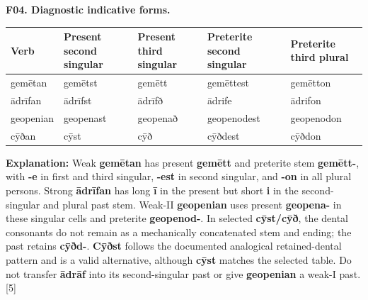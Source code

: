 \par\begin{minipage}{\linewidth}\raggedright
\textbf{F04. Diagnostic indicative forms.}

\par\begingroup
\fontsize{10.5}{13.2}\selectfont
\setlength{\LTleft}{0pt}\setlength{\LTright}{\fill}
\noindent
\begin{tabular}{@{}>{\raggedright\arraybackslash}p{18mm}>{\raggedright\arraybackslash}p{23mm}>{\raggedright\arraybackslash}p{22mm}>{\raggedright\arraybackslash}p{26mm}>{\raggedright\arraybackslash}p{23.76mm}@{}}
\toprule
\textbf{Verb} & \textbf{Present second singular} & \textbf{Present third singular} & \textbf{Preterite second singular} & \textbf{Preterite third plural} \\
\midrule
gemētan & gemētst & gemētt & gemēttest & gemētton \\
ādrīfan & ādrīfst & ādrīfð & ādrife & ādrifon \\
geopenian & geopenast & geopenað & geopenodest & geopenodon \\
cȳðan & cȳst & cȳð & cȳðdest & cȳðdon \\
\bottomrule
\end{tabular}
\par\endgroup

\textbf{Explanation:} Weak \textbf{gemētan} has present \textbf{gemētt} and preterite stem \textbf{gemētt-}, with \textbf{-e} in first and third singular, \textbf{-est} in second singular, and \textbf{-on} in all plural persons. Strong \textbf{ādrīfan} has long \textbf{ī} in the present but short \textbf{i} in the second-singular and plural past stem. Weak-II \textbf{geopenian} uses present \textbf{geopena-} in these singular cells and preterite \textbf{geopenod-}. In selected \textbf{cȳst/\allowbreak{}cȳð}, the dental consonants do not remain as a mechanically concatenated stem and ending; the past retains \textbf{cȳðd-}. \textbf{Cȳðst} follows the documented analogical retained-dental pattern and is a valid alternative, although \textbf{cȳst} matches the selected table. Do not transfer \textbf{ādrāf} into its second-singular past or give \textbf{geopenian} a weak-I past. [5]

\end{minipage}\par\addvspace{4pt}

